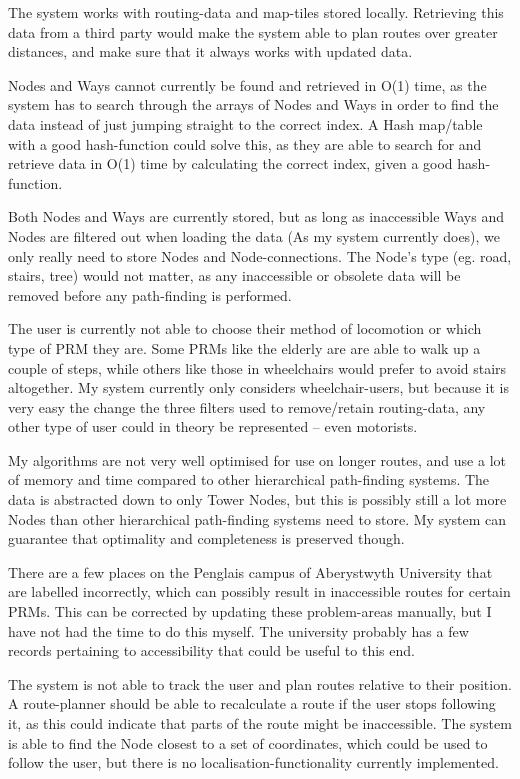 The system works with routing-data and map-tiles stored locally. Retrieving this data from a third party\cite{geofabrik,openlayers} would make the system able to plan routes over greater distances, and make sure that it always works with updated data.

Nodes and Ways cannot currently be found and retrieved in O(1) time, as the system has to search through the arrays of Nodes and Ways in order to find the data instead of just jumping straight to the correct index. A Hash map/table with a good hash-function could solve this, as they are able to search for and retrieve data in O(1) time by calculating the correct index, given a good hash-function.

Both Nodes and Ways are currently stored, but as long as inaccessible Ways and Nodes are filtered out when loading the data (As my system currently does), we only really need to store Nodes and Node-connections. The Node's type (eg. road, stairs, tree) would not matter, as any inaccessible or obsolete data will be removed before any path-finding is performed.

The user is currently not able to choose their method of locomotion or which type of PRM they are. Some PRMs like the elderly are are able to walk up a couple of steps, while others like those in wheelchairs would prefer to avoid stairs altogether. My system currently only considers wheelchair-users, but because it is very easy the change the three filters used to remove/retain routing-data, any other type of user could in theory be represented -- even motorists.

My algorithms are not very well optimised for use on longer routes, and use a lot of memory and time compared to other hierarchical path-finding systems\cite{botea-etal-jogd04,CCAI07}. The data is abstracted down to only Tower Nodes, but this is possibly still a lot more Nodes than other hierarchical path-finding systems need to store. My system can guarantee that optimality and completeness is preserved though.

There are a few places on the Penglais campus of Aberystwyth University that are labelled incorrectly, which can possibly result in inaccessible routes for certain PRMs. This can be corrected by updating these problem-areas manually, but I have not had the time to do this myself. The university probably has a few records pertaining to accessibility that could be useful to this end.

The system is not able to track the user and plan routes relative to their position. A route-planner should be able to recalculate a route if the user stops following it, as this could indicate that parts of the route might be inaccessible. The system is able to find the Node closest to a set of coordinates, which could be used to follow the user, but there is no localisation-functionality currently implemented.

